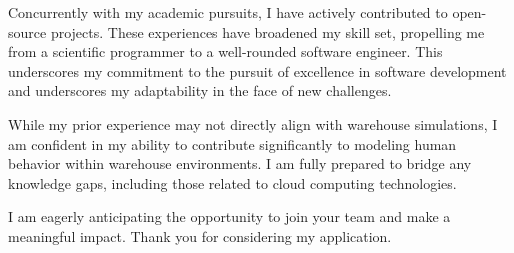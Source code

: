 \documentclass[11pt, a4paper]{awesome-cv}
\begin{document}
\begin{cvletter}
Concurrently with my academic pursuits, I have actively contributed to open-source projects. These experiences have broadened my skill set, propelling me from a scientific programmer to a well-rounded software engineer. This underscores my commitment to the pursuit of excellence in software development and underscores my adaptability in the face of new challenges.

While my prior experience may not directly align with warehouse simulations, I am confident in my ability to contribute significantly to modeling human behavior within warehouse environments. I am fully prepared to bridge any knowledge gaps, including those related to cloud computing technologies.

I am eagerly anticipating the opportunity to join your team and make a meaningful impact. Thank you for considering my application.

\end{cvletter}


\makeletterclosing
\end{document}

